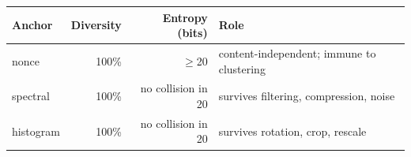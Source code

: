 \begin{tabular}{lrrl}
\toprule
Anchor & Diversity & Entropy (bits) & Role \\
\midrule
nonce & 100\% & $\geq$20 & content-independent; immune to clustering \\
spectral & 100\% & no collision in 20 & survives filtering, compression, noise \\
histogram & 100\% & no collision in 20 & survives rotation, crop, rescale \\
\bottomrule
\end{tabular}
